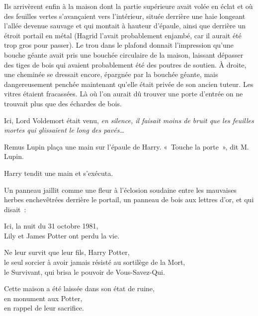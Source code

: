Ils arrivèrent enfin à la maison dont la partie supérieure avait volée en éclat et où des feuilles vertes s'avançaient vers l'intérieur, située derrière une haie longeant l'allée devenue sauvage et qui montait à hauteur d'épaule, ainsi que derrière un étroit portail en métal (Hagrid l'avait probablement enjambé, car il aurait été trop gros pour passer).
Le trou dans le plafond donnait l'impression qu'une bouche géante avait pris une bouchée circulaire de la maison, laissant dépasser des tiges de bois qui avaient probablement été des poutres de soutien.
À droite, une cheminée se dressait encore, épargnée par la bouchée géante, mais dangereusement penchée maintenant qu'elle était privée de son ancien tuteur.
Les vitres étaient fracassées.
Là où l'on aurait dû trouver une porte d'entrée on ne trouvait plus que des échardes de bois.

Ici, Lord Voldemort était venu, \emph{en silence, il faisait moins de bruit que les feuilles mortes qui glissaient le long des pavés…}

Remus Lupin plaça une main sur l'épaule de Harry.
«~Touche la porte~», dit M. Lupin.

Harry tendit une main et s'exécuta.

Un panneau jaillit comme une fleur à l'éclosion soudaine entre les mauvaises herbes enchevêtrées derrière le portail, un panneau de bois aux lettres d'or, et qui disait~:
\begin{center}
Ici, la nuit du 31 octobre 1981,\\
Lily et James Potter ont perdu la vie.

Ne leur survit que leur fils, Harry Potter,\\
le seul sorcier à avoir jamais résisté au sortilège de la Mort,\\
le Survivant, qui brisa le pouvoir de Vous-Savez-Qui.

Cette maison a été laissée dans son état de ruine,\\
en monument aux Potter,\\
en rappel de leur sacrifice.
\end{center}

